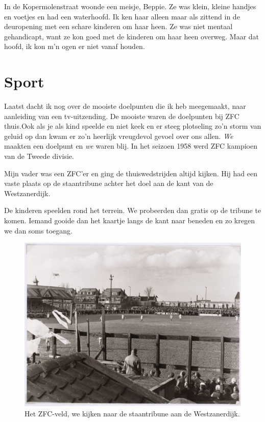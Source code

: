 \documentclass[10pt,twoside, openright]{memoir}
\begin{document}
In de Kopermolenstraat woonde een meisje, Beppie. Ze was klein, kleine handjes en voetjes en had een waterhoofd. Ik ken haar alleen maar als zittend in de deuropening met een schare kinderen om haar heen. Ze was niet mentaal gehandicapt, want ze kon goed met de kinderen om haar heen overweg. Maar dat hoofd, ik kon m’n ogen er niet vanaf houden.

\section{Sport} %
\label{cha:sport}

Laatst dacht ik nog over de mooiste doelpunten die ik heb meegemaakt, naar aanleiding van een tv-uitzending. De mooiste waren de doelpunten bij ZFC thuis.Ook als je als kind speelde en niet keek en er steeg plotseling zo’n storm van geluid op dan kwam er zo’n heerlijk vreugdevol gevoel over ons allen. \emph{We} maakten een doelpunt en \emph{we} waren blij. In het seizoen 1958 werd ZFC kampioen van de Tweede divisie.

Mijn vader was een ZFC’er en ging de thuiswedstrijden altijd kijken. Hij had een vaste plaats op de staantribune achter het doel aan de kant van de Westzanerdijk. 

De kinderen speelden rond het terrein. We probeerden dan gratis op de tribune te komen. Iemand gooide dan het kaartje langs de kant naar beneden en zo kregen we dan soms toegang. 

\begin{figure}
\includegraphics[width=\textwidth]{img/74zfc}
\caption*{\footnotesize Het ZFC-veld, we kijken naar de staantribune aan de Westzanerdijk.}
\end{figure}
\end{document}
